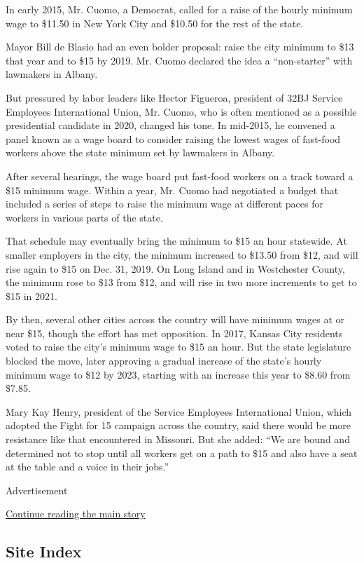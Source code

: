 In early 2015, Mr. Cuomo, a Democrat, called for a raise of the hourly
minimum wage to \$11.50 in New York City and \$10.50 for the rest of the
state.

Mayor Bill de Blasio had an even bolder proposal: raise the city minimum
to \$13 that year and to \$15 by 2019. Mr. Cuomo declared the idea a
``non-starter'' with lawmakers in Albany.

But pressured by labor leaders like Hector Figueroa, president of 32BJ
Service Employees International Union, Mr. Cuomo, who is often mentioned
as a possible presidential candidate in 2020, changed his tone. In
mid-2015, he convened a panel known as a wage board to consider raising
the lowest wages of fast-food workers above the state minimum set by
lawmakers in Albany.

After several hearings, the wage board put fast-food workers on a track
toward a \$15 minimum wage. Within a year, Mr. Cuomo had negotiated a
budget that included a series of steps to raise the minimum wage at
different paces for workers in various parts of the state.

That schedule may eventually bring the minimum to \$15 an hour
statewide. At smaller employers in the city, the minimum increased to
\$13.50 from \$12, and will rise again to \$15 on Dec. 31, 2019. On Long
Island and in Westchester County, the minimum rose to \$13 from \$12,
and will rise in two more increments to get to \$15 in 2021.

By then, several other cities across the country will have minimum wages
at or near \$15, though the effort has met opposition. In 2017, Kansas
City residents voted to raise the city's minimum wage to \$15 an hour.
But the state legislature blocked the move, later approving a gradual
increase of the state's hourly minimum wage to \$12 by 2023, starting
with an increase this year to \$8.60 from \$7.85.

Mary Kay Henry, president of the Service Employees International Union,
which adopted the Fight for 15 campaign across the country, said there
would be more resistance like that encountered in Missouri. But she
added: ``We are bound and determined not to stop until all workers get
on a path to \$15 and also have a seat at the table and a voice in their
jobs.''

Advertisement

\protect\hyperlink{after-bottom}{Continue reading the main story}

\hypertarget{site-index}{%
\subsection{Site Index}\label{site-index}}

